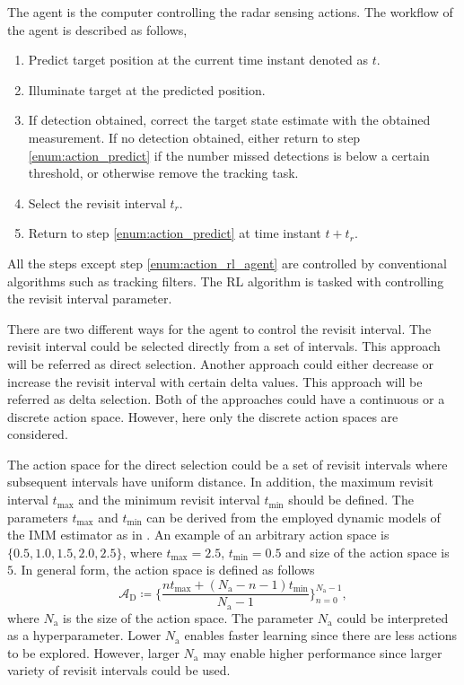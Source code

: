 \documentclass[english, 12pt, a4paper, elec, utf8, a-1b, online]{aaltothesis}
\newcommand{\As}{\mathcal{A}}
\newcommand{\tmax}{t_\text{max}}
\newcommand{\tmin}{t_\text{min}}
\newcommand{\Asdir}{\As_\text{D}}
\newcommand{\nacts}{{N_\text{a}}}
\begin{document}
The agent is the computer controlling the radar sensing actions.
The workflow of the agent is described as follows,
\begin{enumerate}
    \item Predict target position at the current time instant denoted as $t$. \label{enum:action_predict}
    \item Illuminate target at the predicted position.
    \item If detection obtained, correct the target state estimate with the obtained measurement. If no detection obtained, either return to step \ref{enum:action_predict} if the number missed detections is below a certain threshold, or otherwise remove the tracking task.
    \item Select the revisit interval $t_r$. \label{enum:action_rl_agent}
    \item Return to step \ref{enum:action_predict} at time instant $t+t_r$.
\end{enumerate}
All the steps except step \ref{enum:action_rl_agent} are controlled by conventional algorithms such as tracking filters.
The RL algorithm is tasked with controlling the revisit interval parameter.

There are two different ways for the agent to control the revisit interval.
The revisit interval could be selected directly from a set of intervals.
This approach will be referred as direct selection.
Another approach could either decrease or increase the revisit interval with certain delta values.
This approach will be referred as delta selection.
Both of the approaches could have a continuous or a discrete action space.
However, here only the discrete action spaces are considered.

The action space for the direct selection could be a set of revisit intervals where subsequent intervals have uniform distance.
In addition, the maximum revisit interval $\tmax$ and the minimum revisit interval $\tmin$ should be defined.
The parameters $\tmax$ and $\tmin$ can be derived from the employed dynamic models of the IMM estimator as in \cite{Benoudnine2006}.
An example of an arbitrary action space is $\{0.5, 1.0, 1.5, 2.0, 2.5\}$, where $\tmax=2.5$, $\tmin=0.5$ and size of the action space is $5$.
In general form, the action space is defined as follows
\begin{equation}\label{eq:as_direct}
    \Asdir \coloneqq \{ \frac{n \tmax + (\nacts-n-1) \tmin}{\nacts-1} \}_{n=0}^{\nacts-1},    
\end{equation}
where $\nacts$ is the size of the action space.
The parameter $\nacts$ could be interpreted as a hyperparameter.
Lower $\nacts$ enables faster learning since there are less actions to be explored.
However, larger $\nacts$ may enable higher performance since larger variety of revisit intervals could be used.
\end{document}
